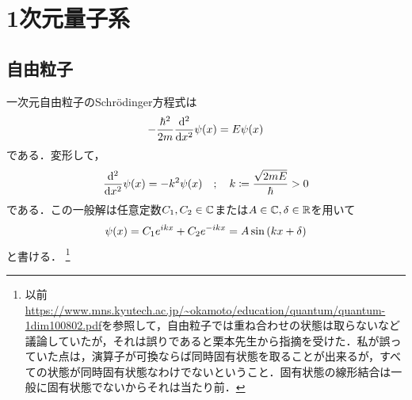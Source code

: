 \section{1次元量子系}
\subsection{自由粒子}
一次元自由粒子のSchr\"{o}dinger方程式は
\begin{align}
    -\frac{\hbar^2}{2m}\frac{\mathrm{d}^{2} }{\mathrm{d} x^{2}}\psi(x)=E\psi(x)
\end{align}
である．変形して，
\begin{align}
    \frac{\mathrm{d}^{2} }{\mathrm{d} x^{2}}\psi(x)=-k^2\psi(x)\quad;\quad k\coloneqq\frac{\sqrt{2mE}}{\hbar}>0
\end{align}
である．この一般解は任意定数$C_1,C_2\in\mathbb{C}$または$A\in\mathbb{C},\delta\in\mathbb{R}$を用いて
\begin{align}
    \psi(x)=C_1e^{ikx}+C_2e^{-ikx}=A\sin\qty(kx+\delta)\label{free_sol}
\end{align}
と書ける．
\footnote{以前\url{https://www.mns.kyutech.ac.jp/~okamoto/education/quantum/quantum-1dim100802.pdf}を参照して，自由粒子では重ね合わせの状態は取らないなど議論していたが，それは誤りであると栗本先生から指摘を受けた．私が誤っていた点は，演算子が可換ならば同時固有状態を取ることが出来るが，すべての状態が同時固有状態なわけでないということ．固有状態の線形結合は一般に固有状態でないからそれは当たり前．}
\begin{comment}
\begin{cl}\label{thm:eikx}
自由粒子では，この重ね合わせ状態は許されず，
\begin{align}
    \psi(x)=Ce^{ikx}\quad\text{xor}\quad\psi(x)=Ce^{-ikx}
\end{align}
のどちらかになる．%
\end{cl}
\begin{pr}
自由粒子ではHamiltonianと運動量が可換なので，エネルギー固有状態は同時に運動量の固有状態でなければならない．\eqref{free_sol}のとき，
\begin{align}
    -i\hbar\drv{\psi(x)}{x}&=\hbar k \qty(C_1e^{ikx}-C_2e^{ikx})
\end{align}
となるので，運動量の固有状態になるのは$C_1=0\ \text{xor}\ C_2=0$のときである．
\end{pr}

\subsection*{変な境界条件の入れ方}
この規格化には
\begin{enumerate}
    \item Dirac deltaを用いる方法
    \item fixed boundary condition $\psi(0)=\psi(L)=0$を用いる方法
    \item periodic boundary condition (PBC) $\psi(x)=\psi(x+L)$を用いる方法
\end{enumerate}
を用いるのが通常であるが，逆張りオタクなので$\psi(x+L)=e^{i\theta}\psi(x)\ (0\leq\theta<2\pi)$と入れてみる．
\end{comment}

